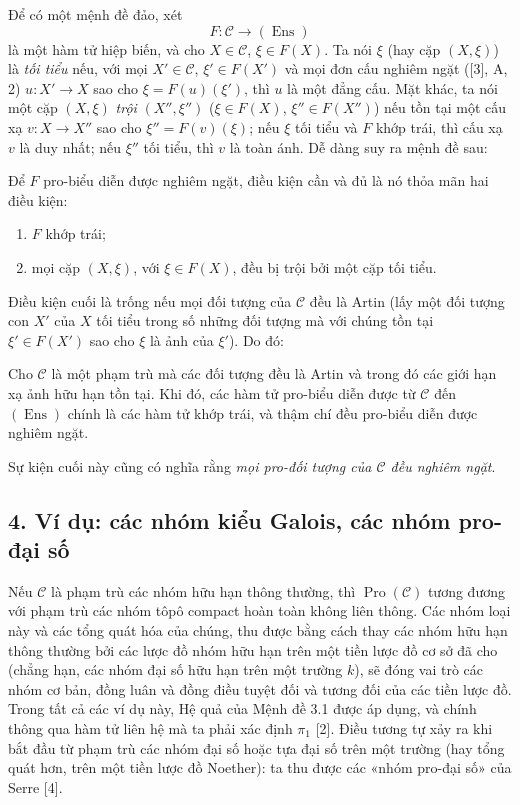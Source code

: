 Để có một mệnh đề đảo, xét
\[
  F:\mathcal C\longrightarrow(\operatorname{Ens})
\]
là một hàm tử hiệp biến, và cho $X\in\mathcal C$, $\xi\in F(X)$. Ta nói
$\xi$ (hay cặp $(X,\xi)$) là \emph{tối tiểu} nếu, với mọi
$X'\in\mathcal C$, $\xi'\in F(X')$ và mọi đơn cấu nghiêm ngặt ([3], A, 2)
$u:X'\longrightarrow X$ sao cho $\xi=F(u)(\xi')$, thì $u$ là một đẳng cấu.
Mặt khác, ta nói một cặp $(X,\xi)$ \emph{trội} $(X'',\xi'')$
($\xi\in F(X)$, $\xi''\in F(X'')$) nếu tồn tại một cấu xạ
$v:X\longrightarrow X''$ sao cho $\xi''=F(v)(\xi)$; nếu $\xi$ tối tiểu và
$F$ khớp trái, thì cấu xạ $v$ là duy nhất; nếu $\xi''$ tối tiểu, thì $v$ là
toàn ánh. Dễ dàng suy ra mệnh đề sau:

 Để $F$ pro-biểu diễn được nghiêm ngặt, điều kiện cần và
đủ là nó thỏa mãn hai điều kiện:
\begin{enumerate}
\item[(i)] $F$ khớp trái;
\item[(ii)] mọi cặp $(X,\xi)$, với $\xi\in F(X)$, đều bị trội bởi một cặp
tối tiểu.
\end{enumerate}

Điều kiện cuối là trống nếu mọi đối tượng của $\mathcal C$ đều là Artin (lấy
một đối tượng con $X'$ của $X$ tối tiểu trong số những đối tượng mà với chúng
tồn tại $\xi'\in F(X')$ sao cho $\xi$ là ảnh của $\xi'$). Do đó:

 Cho $\mathcal C$ là một phạm trù mà các đối tượng đều là
Artin và trong đó các giới hạn xạ ảnh hữu hạn tồn tại. Khi đó, các hàm tử
pro-biểu diễn được từ $\mathcal C$ đến $(\operatorname{Ens})$ chính là các
hàm tử khớp trái, và thậm chí đều pro-biểu diễn được nghiêm ngặt.

Sự kiện cuối này cũng có nghĩa rằng \emph{mọi pro-đối tượng của $\mathcal C$
đều nghiêm ngặt}.

\subsection*{4. Ví dụ: các nhóm kiểu Galois, các nhóm pro-đại số}

Nếu $\mathcal C$ là phạm trù các nhóm hữu hạn thông thường, thì
$\operatorname{Pro}(\mathcal C)$ tương đương với phạm trù các nhóm tôpô
compact hoàn toàn không liên thông. Các nhóm loại này và các tổng quát hóa
của chúng, thu được bằng cách thay các nhóm hữu hạn thông thường bởi các lược
đồ nhóm hữu hạn trên một tiền lược đồ cơ sở đã cho (chẳng hạn, các nhóm đại
số hữu hạn trên một trường $k$), sẽ đóng vai trò các nhóm cơ bản, đồng luân
và đồng điều tuyệt đối và tương đối của các tiền lược đồ. Trong tất cả các
ví dụ này, Hệ quả của Mệnh đề 3.1 được áp dụng, và chính thông qua hàm tử liên
hệ mà ta phải xác định $\pi_1$ [2]. Điều tương tự xảy ra khi bắt đầu từ phạm
trù các nhóm đại số hoặc tựa đại số trên một trường (hay tổng quát hơn, trên
một tiền lược đồ Noether): ta thu được các «nhóm pro-đại số» của Serre [4].

